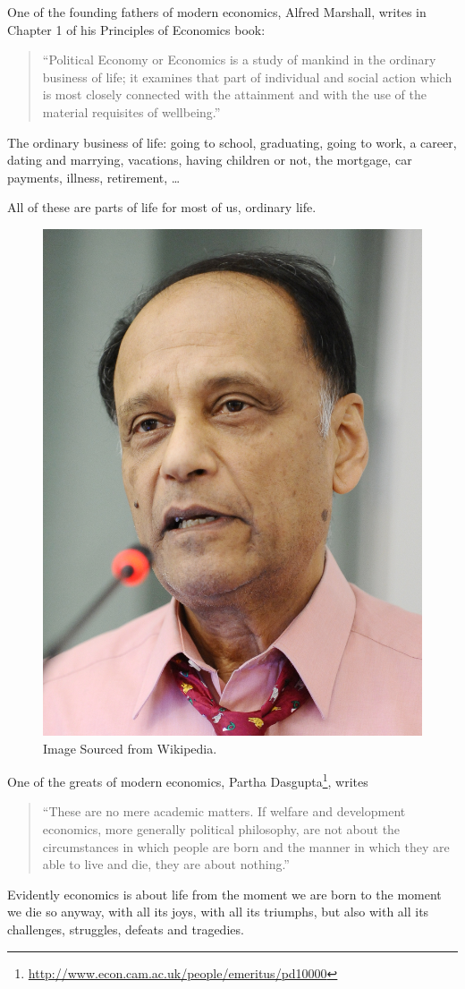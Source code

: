 \documentclass[
]{book}
\begin{document}
One of the founding fathers of modern economics, Alfred Marshall, writes in Chapter 1 of his Principles of Economics book:

\begin{quote}
``Political Economy or Economics is a study of mankind in the ordinary business of life; it examines that part of individual and social action which is most closely connected with the attainment and with the use of the material requisites of wellbeing.''
\end{quote}

The ordinary business of life: going to school, graduating, going to work, a career, dating and marrying, vacations, having children or not, the mortgage, car payments, illness, retirement, \ldots{}

All of these are parts of life for most of us, ordinary life.

\begin{figure}
\includegraphics[width=0.5\linewidth]{img/ch0/Partha_Dasgupta} \caption{Image Sourced from Wikipedia.}\label{fig:fig003}
\end{figure}

One of the greats of modern economics, Partha Dasgupta\footnote{\url{http://www.econ.cam.ac.uk/people/emeritus/pd10000}}, writes

\begin{quote}
``These are no mere academic matters. If welfare and development economics, more generally political philosophy, are not about the circumstances in which people are born and the manner in which they are able to live and die, they are about nothing.''
\end{quote}

Evidently economics is about life from the moment we are born to the moment we die so anyway, with all its joys, with all its triumphs, but also with all its challenges, struggles, defeats and tragedies.
\end{document}
